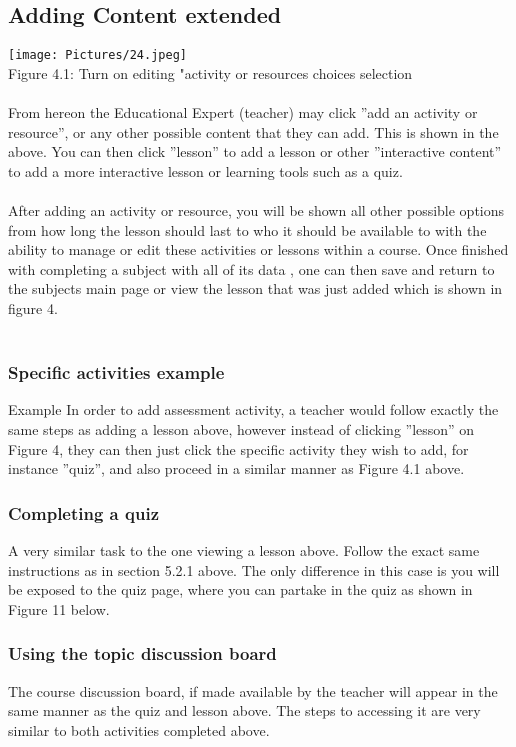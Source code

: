 \documentclass[english]{article}
\begin{document}
\subsection{Adding Content extended}
\texttt{[image: Pictures/24.jpeg]} \\
Figure 4.1: Turn on editing "activity or resources choices selection \\\\
From hereon the Educational Expert (teacher) may click ”add an activity or resource”, or any other possible content that they can add. This is shown in the above. You can then click ”lesson” to add a lesson or other ”interactive content” to add a more interactive lesson or learning tools such as a quiz. \\\\
After adding an activity or resource, you will be shown all other possible options from how long the lesson should last to who it should be available to with the ability to manage or edit these activities or lessons within a course. Once finished with completing a subject with all of its data , one can then save and return to the subjects main page or view the lesson that was just added which is shown in figure 4. \\\\

\subsubsection{Specific activities example}
Example
In order to add assessment activity, a teacher would follow exactly the same steps as adding a lesson above, however instead of clicking ”lesson” on Figure 4, they can then just click the specific activity they wish to add, for instance ”quiz”, and also proceed in a similar manner as Figure 4.1 above.

\subsubsection{Completing a quiz}
A very similar task to the one viewing a lesson above. Follow the exact same instructions as in section 5.2.1 above. The only difference in this case is you will be exposed to the quiz page, where you can partake in the quiz as shown in Figure 11 below.

\subsubsection{Using the topic discussion board}
The course discussion board, if made available by the teacher will appear in the same manner as the quiz and lesson above. The steps to accessing it are very similar to both activities completed above.
\end{document}

